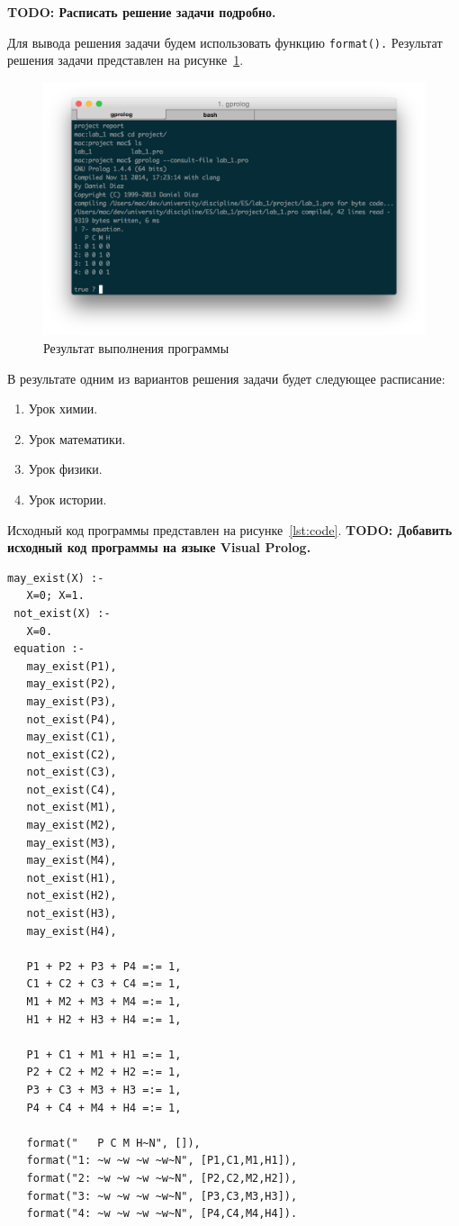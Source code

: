 \newpage

\textbf{TODO: Расписать решение задачи подробно.}

\newpage

Для вывода решения задачи будем использовать функцию \texttt{format().}
Результат решения задачи представлен на рисунке~\ref{fig:figure}.

\begin{figure}[h!]
  \centering
  \includegraphics[width=150mm]{img/figure}
  \caption{Результат выполнения программы}
  \label{fig:figure}
\end{figure}

В результате одним из вариантов решения задачи будет следующее расписание:
\begin{enumerate}
  \item Урок химии.
  \item Урок математики.
  \item Урок физики.
  \item Урок истории.
\end{enumerate}

\pagebreak
Исходный код программы представлен на рисунке~\ref{lst:code}.
\textbf{TODO: Добавить исходный код программы на языке Visual Prolog.}

\begin{lstlisting}[style=source_code,caption=Исходный код программы,label=lst:code]
 may_exist(X) :-
   X=0; X=1.
 not_exist(X) :-
   X=0.
 equation :-
   may_exist(P1),
   may_exist(P2),
   may_exist(P3),
   not_exist(P4),
   may_exist(C1),
   not_exist(C2),
   not_exist(C3),
   not_exist(C4),
   not_exist(M1),
   may_exist(M2),
   may_exist(M3),
   may_exist(M4),
   not_exist(H1),
   not_exist(H2),
   not_exist(H3),
   may_exist(H4),

   P1 + P2 + P3 + P4 =:= 1,
   C1 + C2 + C3 + C4 =:= 1,
   M1 + M2 + M3 + M4 =:= 1,
   H1 + H2 + H3 + H4 =:= 1,

   P1 + C1 + M1 + H1 =:= 1,
   P2 + C2 + M2 + H2 =:= 1,
   P3 + C3 + M3 + H3 =:= 1,
   P4 + C4 + M4 + H4 =:= 1,
   
   format("   P C M H~N", []),
   format("1: ~w ~w ~w ~w~N", [P1,C1,M1,H1]),
   format("2: ~w ~w ~w ~w~N", [P2,C2,M2,H2]),
   format("3: ~w ~w ~w ~w~N", [P3,C3,M3,H3]),
   format("4: ~w ~w ~w ~w~N", [P4,C4,M4,H4]).
\end{lstlisting}

\newpage